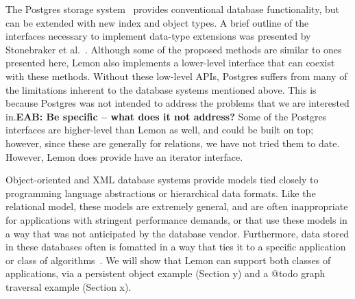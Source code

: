 \documentclass[letterpaper,twocolumn,english]{article}
\newcommand{\yad}{Lemon\xspace}
\newcommand{\eab}[1]{{\bf EAB: #1}}
\begin{document}
The Postgres storage system~\cite{postgres} provides conventional
database functionality, but can be extended with new index and object
types.  A brief outline of the interfaces necessary to implement data-type extensions was presented by Stonebraker et al.~\cite{newTypes}.
Although some of the proposed methods are similar to ones presented
here, \yad also implements a lower-level interface that can coexist
with these methods.  Without these low-level APIs, Postgres
suffers from many of the limitations inherent to the database systems
mentioned above.  This is because Postgres was not intended to address
the problems that we are interested in.\eab{Be specific -- what does it not address?}  Some of the Postgres interfaces are higher-level than \yad as well, and could be built on top; however, since these are generally for relations, we have not tried them to date.
However, \yad does provide have an iterator interface.

Object-oriented and XML database systems provide models tied closely
to programming language abstractions or hierarchical data formats.
Like the relational model, these models are extremely general, and are
often inappropriate for applications with stringent performance
demands, or that use these models in a way that was not anticipated by
the database vendor.  Furthermore, data stored in these databases
often is fomatted in a way that ties it to a specific application or
class of algorithms~\cite{lamb}.  We will show that \yad can support
both classes of applications, via a persistent object example (Section
y) and a @todo graph traversal example (Section x).

\end{document}
